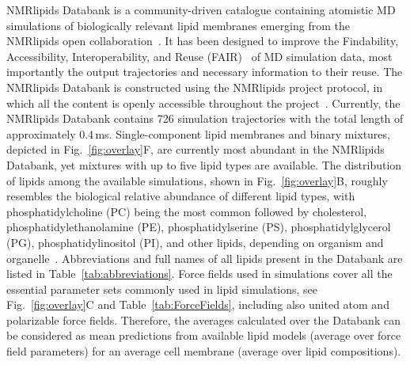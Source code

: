 \documentclass[fleqn,10pt]{wlscirep}
\begin{document}
NMRlipids Databank is a community-driven catalogue containing atomistic MD simulations of biologically relevant lipid membranes emerging from the NMRlipids open collaboration~\cite{botan15,ollila16,catte16,antila19,bacle21}. It has been designed to improve the Findability, Accessibility, Interoperability, and Reuse (FAIR)~\cite{wilkinson16} of MD simulation data, most importantly the output trajectories and necessary information to their reuse. The NMRlipids Databank is constructed using the NMRlipids project protocol, in which all the content is openly accessible throughout the project~\cite{botan15}. Currently, the NMRlipids Databank contains 726 simulation trajectories with the total length of approximately 0.4\,ms. Single-component lipid membranes and binary mixtures, depicted in Fig.~\ref{fig:overlay}F, are currently most abundant in the NMRlipids Databank, yet mixtures with up to five lipid types are available. The distribution of lipids among the available simulations, shown in Fig.~\ref{fig:overlay}B, roughly resembles the biological relative abundance of different lipid types, with phosphatidylcholine (PC) being the most common followed by cholesterol, phosphatidylethanolamine (PE), phosphatidylserine (PS), phosphatidylglycerol (PG), phosphatidylinositol (PI), and other lipids, depending on organism and organelle~\cite{vanmeer08}. Abbreviations and full names of all lipids present in the Databank are listed in Table~\ref{tab:abbreviations}. Force fields used in simulations cover all the essential parameter sets commonly used in lipid simulations, see Fig.~\ref{fig:overlay}C and Table~\ref{tab:ForceFields}, including also united atom and polarizable force fields. Therefore, the averages calculated over the Databank can be considered as mean predictions from available lipid models (average over force field parameters) for an average cell membrane (average over lipid compositions).
\end{document}
